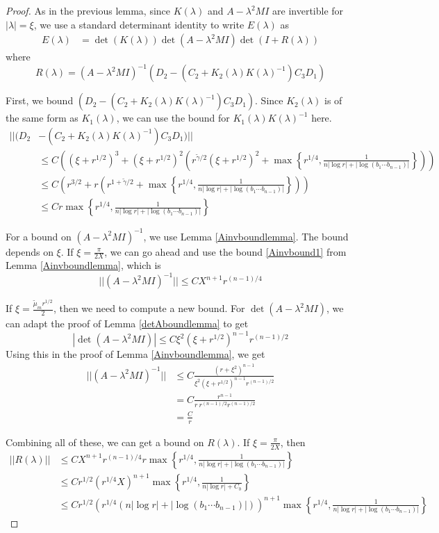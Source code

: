 \documentclass[thesis.tex]{subfiles}
\begin{document}
\begin{lemma}
\begin{proof}
As in the previous lemma, since $K(\lambda)$ and $A - \lambda^2 M I$ are invertible for $|\lambda| = \xi$, we use a standard determinant identity to write $E(\lambda)$ as 
\begin{align*}
E(\lambda)
&= \det(K(\lambda))\det(A - \lambda^2 MI)\det(I + R(\lambda))
\end{align*}
where
\[
R(\lambda) = 
(A - \lambda^2 MI)^{-1}(D_2 - (C_2 + K_2(\lambda)K(\lambda)^{-1})C_3 D_1)
\]

First, we bound $(D_2 - (C_2 + K_2(\lambda)K(\lambda)^{-1})C_3 D_1)$. Since $K_2(\lambda)$ is of the same form as $K_1(\lambda)$, we can use the bound for $K_1(\lambda)K(\lambda)^{-1}$ here.
\begin{align*}
||(D_2 &- (C_2 + K_2(\lambda)K(\lambda)^{-1})C_3 D_1)|| \\
&\leq C \left( (\xi + r^{1/2})^3 + (\xi + r^{1/2})^2 \left( r^{\tilde{\gamma}/2}(\xi + r^{1/2})^2 + \max\left\{ r^{1/4}, \frac{1}{n|\log r| + |\log(b_1 \cdots b_{n-1})| } \right\} \right) \right) \\
&\leq C \left( r^{3/2} + r \left( r^{1 + \tilde{\gamma}/2} + \max\left\{ r^{1/4}, \frac{1}{n|\log r| + |\log(b_1 \cdots b_{n-1})| } \right\} \right) \right) \\
&\leq C r \max\left\{ r^{1/4}, \frac{1}{n|\log r| + |\log(b_1 \cdots b_{n-1})| } \right\} 
\end{align*}

For a bound on $(A - \lambda^2 MI)^{-1}$, we use Lemma \ref{Ainvboundlemma}. The bound depends on $\xi$. If $\xi = \frac{\pi}{2X}$, we can go ahead and use the bound \eqref{Ainvbound1} from Lemma \ref{Ainvboundlemma}, which is
\[
||(A - \lambda^2 MI)^{-1}|| \leq C X^{n+1} r^{(n-1)/4}
\]

If $\xi = \frac{\tilde{\mu}_m r^{1/2}}{2}$, then we need to compute a new bound. For $\det(A - \lambda^2 MI)$, we can adapt the proof of Lemma \ref{detAboundlemma} to get
\[
|\det(A - \lambda^2 MI)| \leq C \xi^2 (\xi + r^{1/2})^{n-1} r^{(n-1)/2}
\]
Using this in the proof of Lemma \ref{Ainvboundlemma}, we get
\begin{align*}
||(A - \lambda^2 MI)^{-1}|| &\leq C \frac{(r + \xi^2)^{n-1}}{\xi^2 (\xi + r^{1/2})^{n-1} r^{(n-1)/2}} \\
&= C \frac{r^{n-1}}{r \: r^{(n-1)/2} r^{(n-1)/2}} \\
&= \frac{C}{r} 
\end{align*}

Combining all of these, we can get a bound on $R(\lambda)$. If $\xi = \frac{\pi}{2X}$, then
\begin{align*}
||R(\lambda)|| &\leq C X^{n+1} r^{(n-1)/4} r \max\left\{ r^{1/4}, \frac{1}{n|\log r| + |\log(b_1 \cdots b_{n-1})| } \right\} \\
&\leq C r^{1/2} (r^{1/4} X)^{n+1} \max\left\{ r^{1/4}, \frac{1}{n|\log r| + C_b } \right\} \\
&\leq C r^{1/2} \left(r^{1/4}(n|\log r| + |\log(b_1 \cdots b_{n-1})|)\right)^{n+1} \max\left\{ r^{1/4}, \frac{1}{n|\log r| + |\log(b_1 \cdots b_{n-1})| } \right\}
\end{align*}


\end{proof}
\end{lemma}
\end{document}
